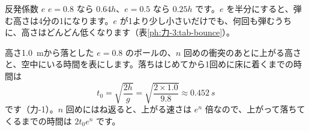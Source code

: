\begin{phbaisuru}[いろいろな値]{反発係数 $e$}
$e=0.8$ なら $0.64h$、$e=0.5$ なら $0.25h$ です。$e$ を半分にすると、弾む高さは4分の1になります。$e$ が1より少し小さいだけでも、何回も弾むうちに、高さはどんどん低くなります（表\ref{ph:力-3:tab-bounce}）。
\end{phbaisuru}

高さ\qty{1.0}{m}から落とした $e=0.8$ のボールの、$n$ 回めの衝突のあとに上がる高さと、空中にいる時間を表にします。落ちはじめてから1回めに床に着くまでの時間は
\[t_0=\sqrt{\frac{2h}{g}}=\sqrt{\frac{2\times1.0}{9.8}}\approx\qty{0.452}{s}\]
です（力-1）。$n$ 回めにはね返ると、上がる速さは $e^n$ 倍なので、上がって落ちてくるまでの時間は $2t_0e^n$ です。
\begin{bkcenter}
\label{ph:力-3:tab-bounce}
\end{bkcenter}

